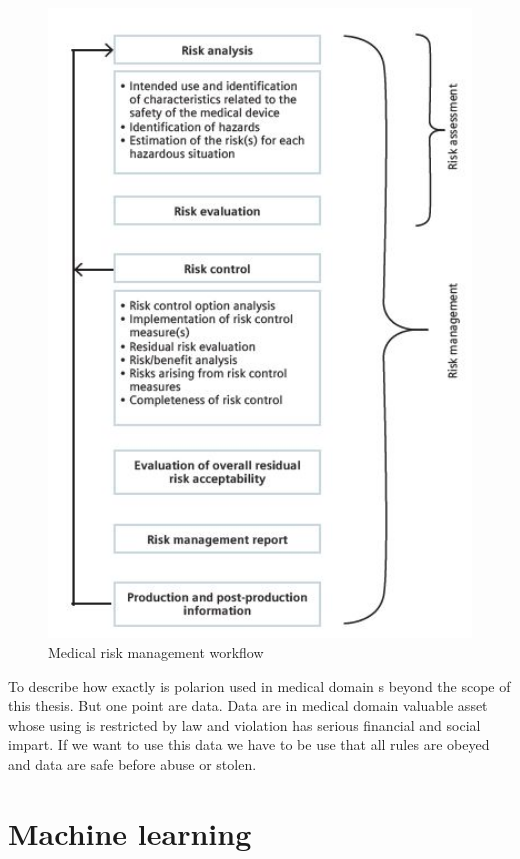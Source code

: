 \documentclass[thesis=M,english]{FITthesis}[2012/06/26]
\begin{document}
\begin{figure}[h!]\centering
	\includegraphics[width=1\textwidth]{pictures/medical_standard}
	\caption{Medical risk management workflow \cite{polarion_alm}}\label{fig:medical_standard}
\end{figure}

To describe how exactly is \acrshort{polarion} used in medical domain s beyond the scope of this thesis. But one point are data. Data are in medical domain valuable asset whose using is restricted by law and violation has serious financial and social impart. If we want to use this data we have to be use that all rules are obeyed and data are safe before abuse or stolen.

\chapter{Machine learning}
\end{document}

